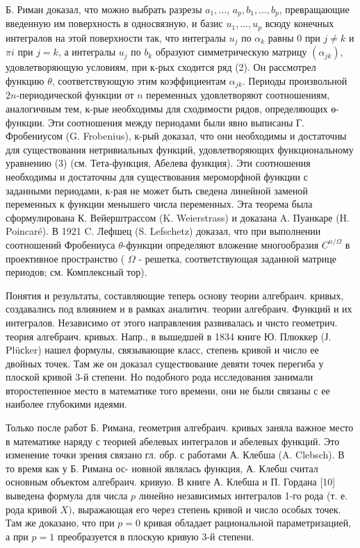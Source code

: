 \documentclass[10pt]{article}
\begin{document}
Б. Риман доказал, что можно выбрать разрезы $a_{1}, \ldots$, $a_{p}, b_{1}, \ldots, b_{p}$, превращающие введенную им поверхность в односвязную, и базис $u_{1}, \ldots, u_{p}$ всюду конечных интегралов на этой поверхности так, что интегралы $u_{j}$ по $\alpha_{k}$ равны 0 при $j \neq k$ и $\pi i$ при $j=k$, а интегралы $u_{j}$ по $b_{k}$ образуют симметрическую матрицу $\left(\alpha_{j k}\right)$, удовлетворяющую условиям, при к-рых сходится ряд (2). Он рассмотрел функцию $\theta$, соответствующую этим коэффициентам $\alpha_{j k}$. Периоды произвольной $2 n$-периодической функции от $n$ переменных удовлетворяют соотношениям, аналогичным тем, к-рые необходимы для сходимости рядов, определяющих ө-функции. Эти соотношения между периодами были явно выписаны Г. Фробениусом (G. Frobenius), к-рый доказал, что они необходимы и достаточны для существования нетривиальных функций, удовлетворяющих функциональному уравнению (3) (см. Тета-функция, Абелева функция). Эти соотношения необходимы и достаточны для существования мероморфной функции с заданными периодами, к-рая не может быть сведена линейной заменой переменных к функции менышего числа переменных. Эта теорема была сформулирована К. Вейерштрассом (K. Weierstrass) и доказана A. Пуанкаре (H. Poincaré). В 1921 C. Лефшец (S. Lefschetz) доказал, что при выполнении соотношений Фробениуса $\theta$-функции определяют вложение многообразия $C^{n / \Omega}$ в проективное пространство ( $\Omega$ - решетка, соответствующая заданной матрице периодов; см. Комплексный тор).



Понятия и результаты, составляющие теперь основу теории алгебраич. кривых, создавались под влиянием и в рамках аналитич. теории алгебраич. Функций и их интегралов. Независимо от этого направления развивалась и чисто геометрич. теория алгебраич. кривых. Напр., в вышедшей в 1834 книге Ю. Плюккер (Ј. Plüсker) нашел формулы, связывающие класс, степень кривой и число ее двойных точек. Там же он доказал существование девяти точек перегиба у плоской кривой 3-й степени. Но подобного рода исследования занимали второстепенное место в математике того времени, они не были связаны с ее наиболее глубокими идеями.



Только после работ Б. Римана, геометрия алгебраич. кривых заняла важное место в математике наряду с теорией абелевых интегралов и абелевых функций. Это изменение точки зрения связано гл. обр. с работами А. Клебша (A. Clebsch). В то время как у Б. Римана ос- новной являлась функция, А. Клебш считал основным объектом алгебраич. кривую. В книге А. Клебша и П. Гордана [10] выведена формула для числа $p$ линейно независимых интегралов 1-го рода (т. е. рода кривой $X)$, выражающая его через степень кривой и число особых точек. Там же доказано, что при $p=0$ кривая обладает рациональной параметризацией, а при $p=1$ преобразуется в плоскую кривую 3-й степени.
\end{document}

